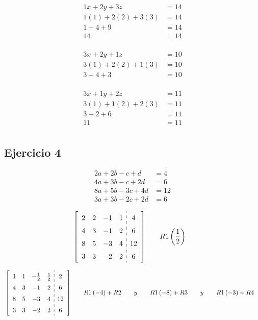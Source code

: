 \documentclass[fleqn]{article}
\begin{document}
    \begin{align*}
      1x+2y+3z&=14 \\
      1(1)+2(2)+3(3) &= 14 \\
      1+4+9 &= 14 \\
      14 &= 14 \\
    \end{align*}

    \begin{align*}
      3x+2y+1z&=10 \\
      3(1) + 2(2) + 1(3) &= 10 \\
      3+4+3 &= 10 \\
    \end{align*}

    \begin{align*}
      3x+1y+2z &= 11 \\
      3(1)+1(2)+2(3) &= 11 \\
      3+2+6 &= 11 \\
      11 &= 11 \\
    \end{align*}

  \subsection{Ejercicio 4}
    \begin{align*}
      2a+2b-c+d&=4 \\
      4a+3b-c+2d&=6 \\
      8a+5b-3c+4d&=12 \\
      3a+3b-2c+2d&=6
    \end{align*}


    \begin{alignat*}{2}
      &\left[
        \begin{array}{cccc:c}
          2 & 2 & -1 & 1 & 4 \\
          4 & 3 & -1 & 2 & 6 \\
          8 & 5 & -3 & 4 & 12 \\
          3 & 3 & -2 & 2 & 6
        \end{array}
      \right]
      \quad
      && R1\left(\frac{1}{2}\right)
    \end{alignat*}

    \begin{alignat*}{2}
      &\left[\def\arraystretch{1.5}
        \begin{array}{cccc:c}
          1 & 1 & -\frac{1}{2} & \frac{1}{2} & 2 \\
          4 & 3 & -1 & 2 & 6 \\
          8 & 5 & -3 & 4 & 12 \\
          3 & 3 & -2 & 2 & 6  
        \end{array}
      \right]
      \quad
      && R1\left(-4\right)+R2 \qquad y \qquad R1\left(-8\right)+R3 \qquad y \qquad R1\left(-3\right)+R4
    \end{alignat*}
\end{document}
